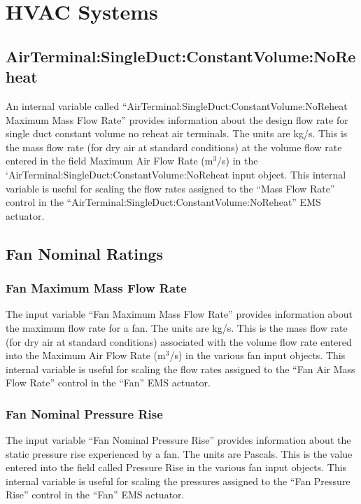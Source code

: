 \section{HVAC Systems}\label{hvac-systems-000}

\subsection{AirTerminal:SingleDuct:ConstantVolume:NoReheat}\label{airTerminalsingleductconstantvolumenoreheat-000}

An internal variable called ``AirTerminal:SingleDuct:ConstantVolume:NoReheat Maximum Mass Flow Rate'' provides information about the design flow rate for single duct constant volume no reheat air terminals. The units are kg/s. This is the mass flow rate (for dry air at standard conditions) at the volume flow rate entered in the field Maximum Air Flow Rate (m\(^{3}\)/s) in the `AirTerminal:SingleDuct:ConstantVolume:NoReheat input object. This internal variable is useful for scaling the flow rates assigned to the ``Mass Flow Rate'' control in the ``AirTerminal:SingleDuct:ConstantVolume:NoReheat'' EMS actuator.

\subsection{Fan Nominal Ratings}\label{fan-nominal-ratings}

\subsubsection{Fan Maximum Mass Flow Rate}\label{fan-maximum-mass-flow-rate}

The input variable ``Fan Maximum Mass Flow Rate'' provides information about the maximum flow rate for a fan. The units are kg/s. This is the mass flow rate (for dry air at standard conditions) associated with the volume flow rate entered into the Maximum Air Flow Rate (m\(^{3}\)/s) in the various fan input objects. This internal variable is useful for scaling the flow rates assigned to the ``Fan Air Mass Flow Rate'' control in the ``Fan'' EMS actuator.

\subsubsection{Fan Nominal Pressure Rise}\label{fan-nominal-pressure-rise}

The input variable ``Fan Nominal Pressure Rise'' provides information about the static pressure rise experienced by a fan. The units are Pascals. This is the value entered into the field called Pressure Rise in the various fan input objects. This internal variable is useful for scaling the pressures assigned to the ``Fan Pressure Rise'' control in the ``Fan'' EMS actuator.


